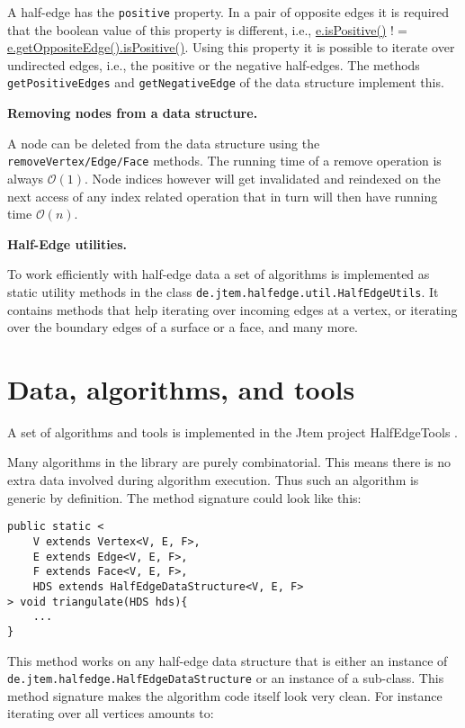 \documentclass[Thesis.tex]{subfiles}
\begin{document}
A half-edge has the {\tt positive} property. In a pair of opposite edges it is required that the boolean
value of this property is different, i.e., \url{e.isPositive()} $!=$ \url{e.getOppositeEdge().isPositive()}.
Using this property it is possible to iterate over undirected edges, i.e., the positive or the negative
half-edges. The methods {\tt getPositiveEdges} and {\tt getNegativeEdge} of the data structure 
implement this.

{\bf Removing nodes from a data structure.}

A node can be deleted from the data structure using the {\tt removeVertex/Edge/Face} methods.
The running time of a remove operation is always $\mathcal{O}(1)$. Node indices however will
get invalidated and reindexed on the next access of any index related operation that in turn will
then have running time $\mathcal{O}(n)$.

{\bf Half-Edge utilities.}

To work efficiently with half-edge data a set of algorithms is implemented as static utility methods
in the class {\tt de.jtem.half\-edge.util.Half\-Edge\-Utils}. It contains methods that help iterating 
over incoming edges at a vertex, or iterating over the boundary edges of a surface or a face, and many more.


\section{Data, algorithms, and tools}

A set of algorithms and tools is implemented in the {\sc Jtem} project {\sc HalfEdgeTools}
\cite{JtemWebsite}. 

Many algorithms in the library are purely combinatorial. This means there is no extra data 
involved during algorithm execution. Thus such an algorithm is generic by definition. The
method signature could look like this:

\begin{lstlisting}
public static <
	V extends Vertex<V, E, F>,
	E extends Edge<V, E, F>,
	F extends Face<V, E, F>,
	HDS extends HalfEdgeDataStructure<V, E, F>
> void triangulate(HDS hds){
	...
}
\end{lstlisting}

This method works on any half-edge data structure that is either an instance of {\tt
de.jtem.half\-edge.HalfEdgeDataStructure} or an instance of a sub-class. This method
signature makes the algorithm code itself look very clean. For instance iterating over
all vertices amounts to:
\end{document}
